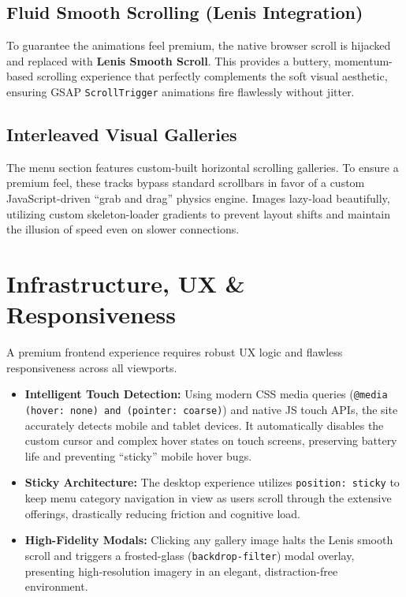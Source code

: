 \documentclass[11pt, a4paper]{article}
\begin{document}
\subsection{Fluid Smooth Scrolling (Lenis Integration)}
To guarantee the animations feel premium, the native browser scroll is hijacked and replaced with \textbf{Lenis Smooth Scroll}. This provides a buttery, momentum-based scrolling experience that perfectly complements the soft visual aesthetic, ensuring GSAP \texttt{ScrollTrigger} animations fire flawlessly without jitter.

\subsection{Interleaved Visual Galleries}
The menu section features custom-built horizontal scrolling galleries. To ensure a premium feel, these tracks bypass standard scrollbars in favor of a custom JavaScript-driven ``grab and drag'' physics engine. Images lazy-load beautifully, utilizing custom skeleton-loader gradients to prevent layout shifts and maintain the illusion of speed even on slower connections.

\section{Infrastructure, UX \& Responsiveness}
A premium frontend experience requires robust UX logic and flawless responsiveness across all viewports.

\begin{itemize}[label=\textcolor{umuaccent}{\textbullet}]
    \item \textbf{Intelligent Touch Detection:} Using modern CSS media queries (\texttt{@media (hover: none) and (pointer: coarse)}) and native JS touch APIs, the site accurately detects mobile and tablet devices. It automatically disables the custom cursor and complex hover states on touch screens, preserving battery life and preventing ``sticky'' mobile hover bugs.
    \item \textbf{Sticky Architecture:} The desktop experience utilizes \texttt{position: sticky} to keep menu category navigation in view as users scroll through the extensive offerings, drastically reducing friction and cognitive load.
    \item \textbf{High-Fidelity Modals:} Clicking any gallery image halts the Lenis smooth scroll and triggers a frosted-glass (\texttt{backdrop-filter}) modal overlay, presenting high-resolution imagery in an elegant, distraction-free environment.
\end{itemize}
\end{document}
